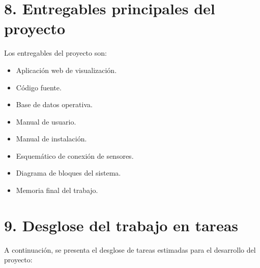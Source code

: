 \documentclass[
11pt, %
]{charter}
\begin{document}
\section{8. Entregables principales del proyecto}
\label{sec:entregables}

Los entregables del proyecto son:

\begin{itemize}
\item Aplicación web de visualización.
\item Código fuente.
\item Base de datos operativa.
\item Manual de usuario.
\item Manual de instalación.
\item Esquemático de conexión de sensores.
\item Diagrama de bloques del sistema.
\item Memoria final del trabajo.
\end{itemize}

\section{9. Desglose del trabajo en tareas}
\label{sec:wbs}

A continuación, se presenta el desglose de tareas estimadas para el desarrollo del proyecto:
\end{document}
